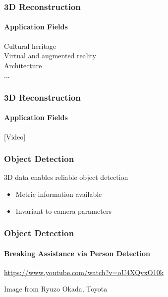 \documentclass[xetex,professionalfont]{beamer}
\begin{document}
\begin{frame}
\frametitle{3D Reconstruction}
\framesubtitle{Application Fields}

Cultural heritage\\\medskip
Virtual and augmented reality\\\medskip
Architecture\\\medskip
...

\end{frame}


\begin{frame}
\frametitle{3D Reconstruction}
\framesubtitle{Application Fields}

\begin{center}
	[Video] %
\end{center}

\end{frame}


\begin{frame}
\frametitle{Object Detection}

3D data enables reliable object detection
\begin{itemize}
	\item Metric information available
	\item Invariant to camera parameters %
\end{itemize}

\end{frame}


\begin{frame}
\frametitle{Object Detection}
\framesubtitle{Breaking Assistance via Person Detection}

\begin{center}
	\url{https://www.youtube.com/watch?v=oU4XQvxO10k} %
\end{center}

\begin{center}
    {\centering Image from Ryuzo Okada, Toyota}
\end{center}

\end{frame}
\end{document}
